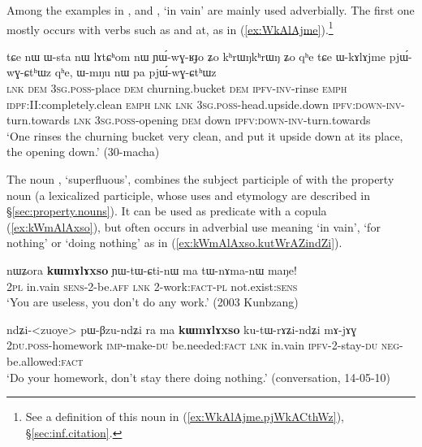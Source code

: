 Among the examples in ,  and  , `in vain' are mainly used adverbially. The first one mostly occurs with verbs such as  and  at, as in (\ref{ex:WkAlAjme}).\footnote{See a definition of this noun in (\ref{ex:WkAlAjme.pjWkACthWz}), §\ref{sec:inf.citation}.}

\begin{exe}
\ex \label{ex:WkAlAjme}
 \gll tɕe nɯ ɯ-sta nɯ lɤtɕʰom nɯ ɲɯ́-wɣ-ʁɟo ʑo kʰrɯŋkʰrɯŋ ʑo qʰe tɕe ɯ-kɤlɤjme pjɯ́-wɣ-ɕtʰɯz qʰe, ɯ-mŋu nɯ pa pjɯ́-wɣ-ɕtʰɯz \\
 \textsc{lnk} \textsc{dem} \textsc{3sg}.\textsc{poss}-place \textsc{dem} churning.bucket \textsc{dem} \textsc{ipfv}-\textsc{inv}-rinse \textsc{emph} \textsc{idpf}:II:completely.clean \textsc{emph} \textsc{lnk} \textsc{lnk} \textsc{3sg}.\textsc{poss}-head.upside.down \textsc{ipfv}:\textsc{down}-\textsc{inv}-turn.towards \textsc{lnk} \textsc{3sg}.\textsc{poss}-opening \textsc{dem} down  \textsc{ipfv}:\textsc{down}-\textsc{inv}-turn.towards \\
 \glt `One rinses the churning bucket very clean, and put it upside down at its place, the opening down.' (30-macha)
\end{exe}

The noun , `superfluous', combines the subject participle of  with the property noun  (a lexicalized participle, whose uses and etymology are described in §\ref{sec:property.nouns}). It can be used as predicate with a copula (\ref{ex:kWmAlAxso}), but often occurs in adverbial use meaning `in vain', `for nothing' or `doing nothing' as in (\ref{ex:kWmAlAxso.kutWrAZindZi}). 

\begin{exe}
\ex \label{ex:kWmAlAxso}
 \gll nɯʑora \textbf{kɯmɤlɤxso} ɲɯ-tɯ-ɕti-nɯ ma tɯ-nɤma-nɯ maŋe! \\
 \textsc{2pl} in.vain \textsc{sens}-2-be.\textsc{aff} \textsc{lnk} 2-work:\textsc{fact}-\textsc{pl} not.exist:\textsc{sens} \\
 \glt `You are useless, you don't do any work.' (2003 Kunbzang)
\end{exe}
 
\begin{exe}
\ex \label{ex:kWmAlAxso.kutWrAZindZi}
 \gll ndʑi-<zuoye> pɯ-βzu-ndʑi ra ma \textbf{kɯmɤlɤxso} ku-tɯ-rɤʑi-ndʑi mɤ-jɤɣ \\
 \textsc{2du}.\textsc{poss}-homework \textsc{imp}-make-\textsc{du} be.needed:\textsc{fact} \textsc{lnk} in.vain \textsc{ipfv}-2-stay-\textsc{du} \textsc{neg}-be.allowed:\textsc{fact} \\
 \glt `Do your homework, don't stay there doing nothing.' (conversation, 14-05-10)
\end{exe}

